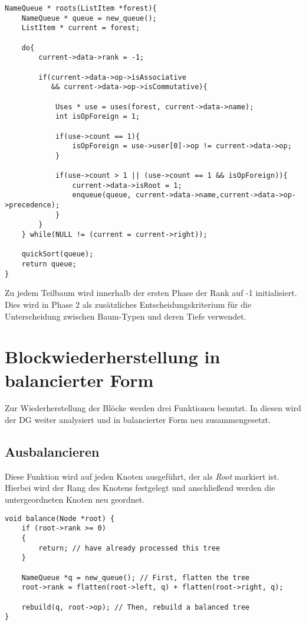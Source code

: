 \begin{lstlisting}[caption=Phase 1: Roots, label=list:roots]
NameQueue * roots(ListItem *forest){
	NameQueue * queue = new_queue();
	ListItem * current = forest;
	
	do{
		current->data->rank = -1;
		
		if(current->data->op->isAssociative 
		   && current->data->op->isCommutative){
			
			Uses * use = uses(forest, current->data->name);
			int isOpForeign = 1;          
			
			if(use->count == 1){
				isOpForeign = use->user[0]->op != current->data->op;
			}
			
			if(use->count > 1 || (use->count == 1 && isOpForeign)){               
				current->data->isRoot = 1;
				enqueue(queue, current->data->name,current->data->op->precedence);
			}
		}
	} while(NULL != (current = current->right));
	
	quickSort(queue);
	return queue;
}
\end{lstlisting}

Zu jedem Teilbaum wird innerhalb der ersten Phase der Rank auf -1 initialisiert. Dies wird in Phase 2 als zusätzliches Entscheidungskriterium für die  Unterscheidung zwischen Baum-Typen und deren Tiefe verwendet.

\section{Blockwiederherstellung in balancierter Form}
Zur Wiederherstellung der Blöcke werden drei Funktionen benutzt. In diesen wird der \ac{DG} weiter analysiert und in balancierter Form neu zusammengesetzt.

\subsection{Ausbalancieren}
Diese Funktion wird auf jeden Knoten ausgeführt, der als \textit{Root} markiert ist. Hierbei wird der Rang des Knotens festgelegt und anschließend werden die untergeordneten Knoten neu geordnet.\\

\begin{lstlisting}[caption=Funktion balance(), label=list:Funktion balace()]
void balance(Node *root) {
	if (root->rank >= 0)
	{
		return; // have already processed this tree
	}

	NameQueue *q = new_queue(); // First, flatten the tree
	root->rank = flatten(root->left, q) + flatten(root->right, q);

	rebuild(q, root->op); // Then, rebuild a balanced tree
}
\end{lstlisting}

